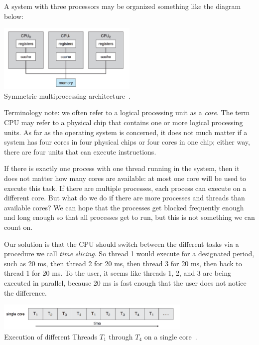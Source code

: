 A system with three processors may be organized something like the diagram below:

\begin{center}
	\includegraphics[width=0.5\textwidth]{images/smp-architecture.png}\\
	Symmetric multiprocessing architecture~\cite{osc}.
\end{center}

Terminology note: we often refer to a logical processing unit as a \textit{core}. The term CPU may refer to a physical chip that contains one or more logical processing units. As far as the operating system is concerned, it does not much matter if a system has four cores in four physical chips or four cores in one chip; either way, there are four units that can execute instructions.

If there is exactly one process with one thread running in the system, then it does not matter how many cores are available: at most one core will be used to execute this task. If there are multiple processes, each process can execute on a different core. But what do we do if there are more processes and threads than available cores? We can hope that the processes get blocked frequently enough and long enough so that all processes get to run, but this is not something we can count on.

Our solution is that the CPU should switch between the different tasks via a procedure we call \textit{time slicing}. So thread 1 would execute for a designated period, such as 20 ms, then thread 2 for 20 ms, then thread 3 for 20 ms, then back to thread 1 for 20 ms. To the user, it seems like threads 1, 2, and 3 are being executed in parallel, because 20 ms is fast enough that the user does not notice the difference.

\begin{center}
	\includegraphics[width=0.7\textwidth]{images/single-core-execution.png}\\
	Execution of different Threads $T_{1}$ through $T_{4}$ on a single core~\cite{osc}.
\end{center}

